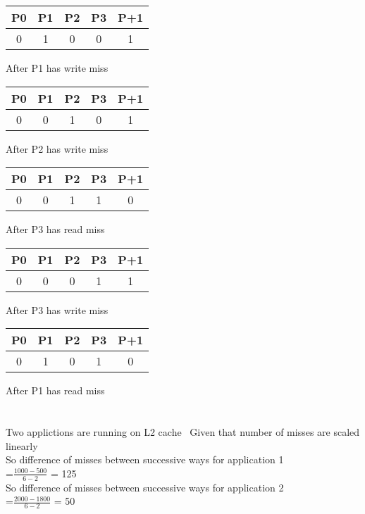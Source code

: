\documentclass[12pt]{article}
\begin{document}
\begin{tabular}{ |c|c|c|c|c| } 
	
	P0 & P1 & P2 & P3 & P+1 \\ 
	\hline
	0 & 1 & 0 & 0 & 1 \\ 
	\hline
\end{tabular}
After P1 has write miss\\


\begin{tabular}{ |c|c|c|c|c| } 
	
	P0 & P1 & P2 & P3 & P+1 \\ 
	\hline
	0 & 0 & 1 & 0 & 1 \\ 
	\hline
\end{tabular}
After P2 has write miss\\


\begin{tabular}{ |c|c|c|c|c| } 
	
	P0 & P1 & P2 & P3 & P+1 \\ 
	\hline
	0 & 0 & 1 & 1 & 0 \\ 
	\hline
\end{tabular}
After P3 has read miss\\


\begin{tabular}{ |c|c|c|c|c| } 
	
	P0 & P1 & P2 & P3 & P+1 \\ 
	\hline
	0 & 0 & 0 & 1 & 1 \\ 
	\hline
\end{tabular}
After P3 has write miss\\

\begin{tabular}{ |c|c|c|c|c| } 
	
	P0 & P1 & P2 & P3 & P+1 \\ 
	\hline
	0 & 1 & 0 & 1 & 0 \\ 
	\hline
\end{tabular}
After P1 has read miss\\


\section{}
Two applictions are running on L2 cache \
Given that number of misses are scaled linearly \\
So difference of misses between successive ways for application 1\\
=\(\frac{1000-500}{6-2}\) = 125\\
So difference of misses between successive ways for application 2 \\
=\(\frac{2000-1800}{6-2}\) = 50\\
\end{document}
